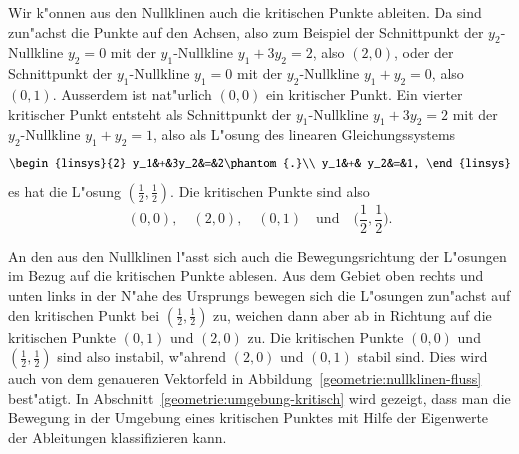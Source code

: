 \begin{beispiel}
Wir k"onnen aus den Nullklinen auch die kritischen Punkte ableiten.
Da sind zun"achst die Punkte auf den Achsen, also zum Beispiel
der Schnittpunkt der $y_2$-Nullkline $y_2=0$ mit der $y_1$-Nullkline
$y_1+3y_2=2$, also $(2,0)$, oder der Schnittpunkt der
$y_1$-Nullkline $y_1=0$ mit der $y_2$-Nullkline $y_1+y_2=0$, also $(0,1)$.
Ausserdem ist nat"urlich $(0,0)$ ein kritischer Punkt.
Ein vierter kritischer Punkt entsteht als Schnittpunkt
der $y_1$-Nullkline $y_1+3y_2=2$ mit der $y_2$-Nullkline $y_1+y_2=1$,
also als L"osung des linearen Gleichungssystems
\[
\begin{linsys}{2}
y_1&+&3y_2&=&2\phantom{.}\\
y_1&+& y_2&=&1,
\end{linsys}
\]
es hat die L"osung $(\frac12,\frac12)$.
Die kritischen Punkte sind also
\begin{equation}
(0,0),\quad
(2,0),\quad
(0,1)\quad\text{und}\quad
\biggl(\frac12,\frac12\biggr).
\label{geometrie:nullklinen-krit}
\end{equation}

An den aus den Nullklinen l"asst sich auch die Bewegungsrichtung der
L"osungen im Bezug auf die kritischen Punkte ablesen.
\label{geometrie:nullklinen-stabilitaet}
Aus dem Gebiet oben rechts und unten links in der N"ahe des Ursprungs
bewegen sich die L"osungen zun"achst auf den kritischen Punkt
bei $(\frac12,\frac12)$ zu, weichen dann aber ab in Richtung auf die
kritischen Punkte $(0,1)$ und $(2,0)$ zu.
Die kritischen Punkte $(0,0)$ und $(\frac12,\frac12)$ sind also
instabil, w"ahrend $(2,0)$ und $(0,1)$ stabil sind.
Dies wird auch von dem genaueren Vektorfeld in
Abbildung~\ref{geometrie:nullklinen-fluss} best"atigt.
In Abschnitt~\ref{geometrie:umgebung-kritisch} wird gezeigt, dass man 
die Bewegung in der Umgebung eines kritischen Punktes mit Hilfe der
Eigenwerte der Ableitungen klassifizieren kann.
\end{beispiel}


